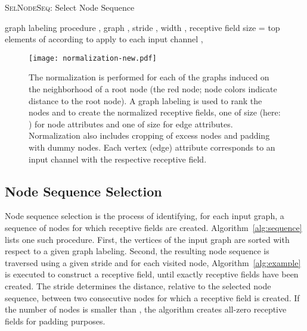 \documentclass{article}
\begin{document}
\begin{algorithm}[t!]
  \small
   \caption{\textsc{SelNodeSeq}: Select Node Sequence}
   \label{alg:sequence}
\begin{algorithmic}[1]
    graph labeling procedure , graph , stride , width , receptive field size 
   \STATE  = top  elements of  according to 
   \STATE 
   \WHILE{}
   \IF{}
   \STATE 
   \ELSE
   \STATE 
   \ENDIF
   \STATE apply  to each input channel
   \STATE , 
   \ENDWHILE
\end{algorithmic}
\end{algorithm}
\vspace{-1mm}




\begin{figure*}
\centering
\texttt{[image: normalization-new.pdf]}
\vspace{-1.6mm}
\caption{\label{fig-normalize} The normalization is performed for each of the graphs induced on the neighborhood of a root node  (the red node; node colors indicate distance to the root node). A graph labeling is used to rank the nodes and to create the normalized receptive fields, one of size  (here: ) for node attributes and one of size  for edge attributes. Normalization also includes cropping of excess nodes and padding with dummy nodes. Each vertex (edge) attribute corresponds to an input channel with the respective receptive field.}
\end{figure*}



\subsection{Node Sequence Selection}
Node sequence selection is the process of identifying, for each input graph, a sequence of nodes for which receptive fields are created. Algorithm~\ref{alg:sequence} lists one such procedure. First, the vertices of the input graph are sorted with respect to a given graph labeling. Second, the resulting node sequence is traversed using a given stride  and for each visited node, Algorithm~\ref{alg:example} is executed to construct a receptive field, until exactly  receptive fields have been created. The stride  determines the distance, relative to the selected node sequence, between two consecutive nodes for which a receptive field is created. If the number of nodes is smaller than , the algorithm creates all-zero receptive fields for padding purposes. 
\end{document}
